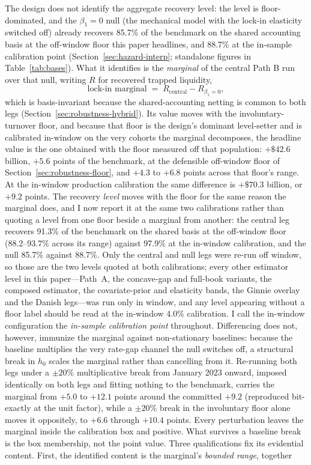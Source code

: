 \documentclass[12pt]{article}
\begin{document}
The design does not identify the aggregate recovery level: the level is floor-dominated, and the $\beta_1 = 0$ null (the mechanical model with the lock-in elasticity switched off) already recovers 85.7\% of the benchmark on the shared accounting basis at the off-window floor this paper headlines, and 88.7\% at the in-sample calibration point (Section~\ref{sec:hazard-interp}; standalone figures in Table~\ref{tab:bases}). What it identifies is the \emph{marginal} of the central Path B run over that null, writing $R$ for recovered trapped liquidity,
\begin{equation}\label{eq:marginal}
\text{lock-in marginal} \;=\; R_{\text{central}} - R_{\beta_1 = 0},
\end{equation}
which is basis-invariant because the shared-accounting netting is common to both legs (Section~\ref{sec:robustness-hybrid}). Its value moves with the involuntary-turnover floor, and because that floor is the design's dominant level-setter and is calibrated in-window on the very cohorts the marginal decomposes, the headline value is the one obtained with the floor measured off that population: $+\$42.6$ billion, $+5.6$ points of the benchmark, at the defensible off-window floor of Section~\ref{sec:robustness-floor}, and $+4.3$ to $+6.8$ points across that floor's range. At the in-window production calibration the same difference is $+\$70.3$ billion, or $+9.2$ points. The recovery \emph{level} moves with the floor for the same reason the marginal does, and I now report it at the same two calibrations rather than quoting a level from one floor beside a marginal from another: the central leg recovers 91.3\% of the benchmark on the shared basis at the off-window floor (88.2--93.7\% across its range) against 97.9\% at the in-window calibration, and the null 85.7\% against 88.7\%. Only the central and null legs were re-run off window, so those are the two levels quoted at both calibrations; every other estimator level in this paper---Path~A, the concave-gap and full-book variants, the composed estimator, the covariate-prior and elasticity bands, the Ginnie overlay and the Danish legs---was run only in window, and any level appearing without a floor label should be read at the in-window 4.0\% calibration. I call the in-window configuration the \emph{in-sample calibration point} throughout. Differencing does not, however, immunize the marginal against non-stationary baselines: because the baseline multiplies the very rate-gap channel the null switches off, a structural break in $h_0$ scales the marginal rather than cancelling from it. Re-running both legs under a $\pm 20\%$ multiplicative break from January 2023 onward, imposed identically on both legs and fitting nothing to the benchmark, carries the marginal from $+5.0$ to $+12.1$ points around the committed $+9.2$ (reproduced bit-exactly at the unit factor), while a $\pm 20\%$ break in the involuntary floor alone moves it oppositely, to $+6.6$ through $+10.4$ points. Every perturbation leaves the marginal inside the calibration box and positive. What survives a baseline break is the box membership, not the point value. Three qualifications fix its evidential content. First, the identified content is the marginal's \emph{bounded range}, together 
\end{document}
